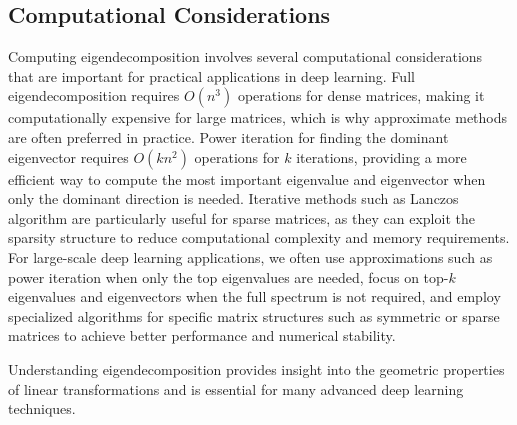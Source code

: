 \subsection{Computational Considerations}

Computing eigendecomposition involves several computational considerations that are important for practical applications in deep learning. Full eigendecomposition requires $O(n^3)$ operations for dense matrices, making it computationally expensive for large matrices, which is why approximate methods are often preferred in practice. Power iteration for finding the dominant eigenvector requires $O(kn^2)$ operations for $k$ iterations, providing a more efficient way to compute the most important eigenvalue and eigenvector when only the dominant direction is needed. Iterative methods such as Lanczos algorithm are particularly useful for sparse matrices, as they can exploit the sparsity structure to reduce computational complexity and memory requirements. For large-scale deep learning applications, we often use approximations such as power iteration when only the top eigenvalues are needed, focus on top-$k$ eigenvalues and eigenvectors when the full spectrum is not required, and employ specialized algorithms for specific matrix structures such as symmetric or sparse matrices to achieve better performance and numerical stability.

Understanding eigendecomposition provides insight into the geometric properties of linear transformations and is essential for many advanced deep learning techniques.
